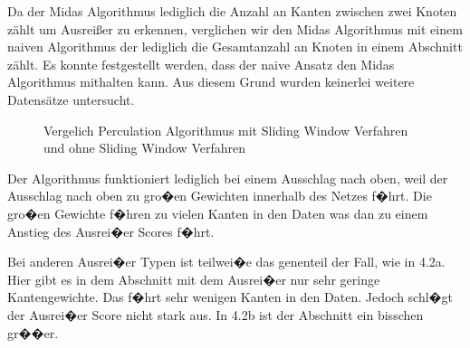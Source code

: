 Da der Midas Algorithmus lediglich die Anzahl an Kanten zwischen zwei Knoten zählt um Ausreißer zu erkennen, verglichen wir den Midas Algorithmus mit einem naiven Algorithmus der lediglich die Gesamtanzahl an Knoten in einem Abschnitt zählt. Es konnte festgestellt werden, dass der naive Ansatz den Midas Algorithmus mithalten kann. Aus diesem Grund wurden keinerlei weitere Datensätze untersucht. 
\label{sec:resultTSwithoutMidas}

\begin{figure}[h]
	\centering
	\caption{Vergelich Perculation Algorithmus mit Sliding Window Verfahren und ohne Sliding Window Verfahren}
	\label{img:midasTSresults}
\end{figure}

Der Algorithmus funktioniert lediglich bei einem Ausschlag nach oben, weil der Ausschlag nach oben zu gro�en Gewichten innerhalb des Netzes f�hrt. Die gro�en Gewichte f�hren zu vielen Kanten in den Daten was dan zu einem Anstieg des Ausrei�er Scores f�hrt.

Bei anderen Ausrei�er Typen ist teilwei�e das genenteil der Fall, wie in 4.2a. Hier gibt es in dem Abschnitt mit dem Ausrei�er nur sehr geringe Kantengewichte. Das f�hrt sehr wenigen Kanten in den Daten. Jedoch schl�gt der Ausrei�er Score nicht stark aus. In 4.2b ist der Abschnitt ein bisschen gr��er.

